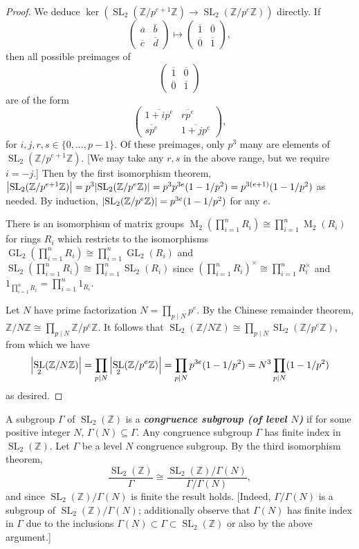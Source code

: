 \documentclass[10pt,leqno]{article}
\theoremstyle{plain}
\theoremstyle{definition}
\numberwithin{equation}{section}
\numberwithin{lem}{section}
\newcommand{\textib}[1]{\textbf{\textit{#1}}}
\DeclareMathOperator{\Mat}{M}
\DeclareMathOperator{\GL}{GL}
\DeclareMathOperator{\SL}{SL}
\begin{document}
\begin{proof}
    We deduce $\ker(\SL_2(\mathbb{Z}/p^{e+1}\mathbb{Z})\to \SL_2(\mathbb{Z}/p^e\mathbb{Z}))$ directly. If \[\begin{pmatrix}
        \overline a & \overline b \\ \overline c & \overline d
    \end{pmatrix}\mapsto \begin{pmatrix}
        \overline 1 & \overline 0 \\ \overline 0 & \overline 1
    \end{pmatrix},\] then all possible preimages of \[\begin{pmatrix}
        \overline 1 & \overline 0 \\ \overline 0 & \overline 1
    \end{pmatrix}\] are of the form \[\begin{pmatrix}
        \overline{1+ip^e} & \overline{rp^e} \\ \overline{sp^e} & \overline{1+jp^e}
    \end{pmatrix},\] for $i,j,r,s\in \{0,\dots,p-1\}$. Of these preimages, only $p^3$ many are elements of $\SL_2(\mathbb{Z}/p^{e+1}\mathbb{Z})$. [We may take any $r,s$ in the above range, but we require $i=-j$.] Then by the first isomorphism theorem, $\abs{\SL_2(\mathbb{Z}/p^{e+1}\mathbb{Z})} = p^3\abs{\SL_2(\mathbb{Z}/p^e\mathbb{Z})} = p^3p^{3e}(1-1/p^2) = p^{3(e+1)}(1-1/p^2)$ as needed. By induction, $\abs{\SL_2(\mathbb{Z}/p^e\mathbb{Z})} = p^{3e}(1-1/p^2)$ for any $e$.

    There is an isomorphism of matrix groups $\Mat_2(\prod_{i=1}^nR_i)\cong \prod_{i=1}^n\Mat_2(R_i)$ for rings $R_i$ which restricts to the isomorphisms $\GL_2(\prod_{i=1}^nR_i)\cong \prod_{i=1}^n\GL_2(R_i)$ and $\SL_2(\prod_{i=1}^nR_i)\cong \prod_{i=1}^n\SL_2(R_i)$ since $(\prod_{i=1}^nR_i)^\times\cong \prod_{i=1}^nR_i^\times$ and $1_{\prod_{i=1}^nR_i} = \prod_{i=1}^n1_{R_i}$.

    Let $N$ have prime factorization $N = \prod_{p\mid N} p^{e}$. By the Chinese remainder theorem, $\mathbb{Z}/N\mathbb{Z}\cong \prod_{p\mid N}\mathbb{Z}/p^{e}\mathbb{Z}$. It follows that $\SL_2(\mathbb{Z}/N\mathbb{Z})\cong \prod_{p\mid N}\SL_2(\mathbb{Z}/p^{e}\mathbb{Z})$, from which we have \[\abs{\SL_2(\mathbb{Z}/N\mathbb{Z})}= \prod_{p\mid N}\abs{\SL_2(\mathbb{Z}/p^{e}\mathbb{Z})} = \prod_{p\mid N}p^{3e}(1-1/p^2) = N^3\prod_{p\mid N}(1-1/p^2)\] as desired.
\end{proof}

A subgroup $\varGamma$ of $\SL_2(\mathbb{Z})$ is a \textib{congruence subgroup (of level $N$)} if for some positive integer $N$, $\varGamma(N)\subseteq \varGamma$. Any congruence subgroup $\varGamma$ has finite index in $\SL_2(\mathbb{Z})$. Let $\varGamma$ be a level $N$ congruence subgroup. By the third isomorphism theorem,
\[\frac{\SL_2(\mathbb{Z})}{\varGamma}\cong \frac{\SL_2(\mathbb{Z})/\varGamma(N)}{\varGamma/\varGamma(N)},\] and since $\SL_2(\mathbb{Z})/\varGamma(N)$ is finite the result holds. [Indeed, $\varGamma/\varGamma(N)$ is a subgroup of $\SL_2(\mathbb{Z})/\varGamma(N)$; additionally observe that $\varGamma(N)$ has finite index in $\varGamma$ due to the inclusions $\varGamma(N)\subset \varGamma \subset \SL_2(\mathbb{Z})$ or also by the above argument.]
\end{document}
